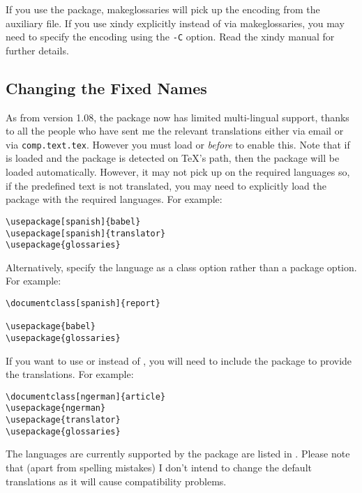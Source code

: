\documentclass[report]{nlctdoc}
\begin{document}
If you use the  package, \gls{makeglossaries}
will pick up the encoding from the auxiliary file. If you use
\gls{xindy} explicitly instead of via \gls*{makeglossaries},
you may need to specify the encoding using the \texttt{-C} 
option. Read the \gls*{xindy} manual for further details.

\subsection{Changing the Fixed Names}
\label{sec:fixednames}

As from version 1.08, the  package now has
limited multi-lingual support, thanks to all the people who have sent
me the relevant translations either via email or via 
\texttt{comp.text.tex}.
However you must load  or  \emph{before} 
 to enable this. Note that if  is loaded 
and the  package is detected on \TeX's path, then the
 package will be loaded automatically.  However,
it may not pick up on the required languages so, if the predefined
text is not translated, you may need to explicitly load the
 package with the required languages. For example:
\begin{verbatim}
\usepackage[spanish]{babel}
\usepackage[spanish]{translator}
\usepackage{glossaries}
\end{verbatim}
Alternatively, specify the language as a class option rather
than a package option. For example:
\begin{verbatim}
\documentclass[spanish]{report}

\usepackage{babel}
\usepackage{glossaries}
\end{verbatim}

If you want to use  or  instead
of , you will need to include the  package 
to provide the translations. For example:
\begin{verbatim}
\documentclass[ngerman]{article}
\usepackage{ngerman}
\usepackage{translator}
\usepackage{glossaries}
\end{verbatim}

The languages are currently supported by the
 package are listed in
. Please note that (apart from
spelling mistakes) I don't intend to change the default translations
as it will cause compatibility problems.
\end{document}
